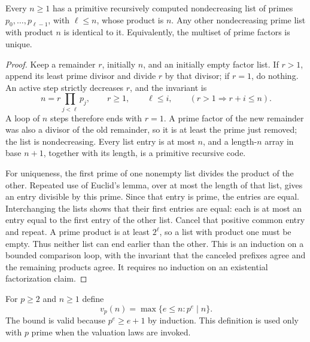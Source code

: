 \begin{theorem}
\label{el:fta}
Every $n\ge1$ has a primitive recursively computed nondecreasing list
of primes $p_0,\ldots,p_{\ell-1}$, with $\ell\le n$, whose product is $n$.
Any other nondecreasing prime list with product $n$ is identical to it.
Equivalently, the multiset of prime factors is unique.
\end{theorem}
\begin{proof}
Keep a remainder $r$, initially $n$, and an initially empty factor list.
If $r>1$, append its least prime divisor and divide $r$ by that divisor;
if $r=1$, do nothing.  An active step strictly decreases $r$, and the
invariant is
\[
 n=r\prod_{j<\ell}p_j,\qquad r\ge1,\qquad
 \ell\le i,\qquad (r>1\Longrightarrow r+i\le n).
\]
A loop of $n$ steps therefore ends with $r=1$.  A prime factor of the
new remainder was also a divisor of the old remainder, so it is at least
the prime just removed; the list is nondecreasing.  Every list entry is
at most $n$, and a length-$n$ array in base $n+1$, together with its
length, is a primitive recursive code.

For uniqueness, the first prime of one nonempty list divides the
product of the other.  Repeated use of Euclid's lemma, over at most the
length of that list, gives an entry divisible by this prime.  Since that
entry is prime, the entries are equal.  Interchanging the lists shows
that their first entries are equal: each is at most an entry equal to
the first entry of the other list.  Cancel that positive common entry
and repeat.  A prime product is at least $2^{\ell}$, so a list with
product one must be empty.  Thus neither list can end earlier than the
other.  This is an induction on a bounded comparison loop, with the
invariant that the canceled prefixes agree and the remaining products
agree.  It requires no induction on an existential factorization claim.
\end{proof}

For $p\ge2$ and $n\ge1$ define
\[
 v_p(n)=\max\{e\le n:p^e\mid n\}.
\]
The bound is valid because $p^e\ge e+1$ by induction.  This definition is
used only with $p$ prime when the valuation laws are invoked.

